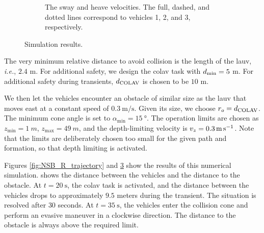 \begin{figure}[p]
\begin{subfigure}[t]{0.475\textwidth}
        \label{fig:NSB_R_surge}
        \vspace{-2.5mm}
    \end{subfigure}
    \hspace{1em}
    \begin{subfigure}[t]{0.475\textwidth}
        \centering
        \hspace*{-1.3em}
        
        \vspace{-8mm}
        \caption{The sway and heave velocities. The full, dashed, and dotted lines correspond to vehicles 1, 2, and 3, respectively.}
        \label{fig:NSB_R_sway_heave}
        \vspace{-2.5mm}
    \end{subfigure}
    \caption{Simulation results.}
    \label{fig:NSB_R_results}    
\end{figure}

The very minimum relative distance to avoid collision is the length of the \gls{lauv}, \emph{i.e.}, $2.4$ m.
For additional safety, we design the \gls{colav} task with $d_{\rm min} = 5$ m.
For additional safety during transients, $d_{\rm COLAV}$ is chosen to be $10$ m.



We then let the vehicles encounter an obstacle of similar size as the \gls{lauv} that moves east at a constant speed of $\SI{0.3}{\meter\per\second}$.
Given its size, we choose $r_o = d_{\rm COLAV}$.
The minimum cone angle is set to $\alpha_{\min} = \SI{15}{\degree}$.
The operation limits are chosen as $z_{\min} = \SI{1}{m}$, $z_{\max} = \SI{49}{m}$, and the depth-limiting velocity is $v_z = \SI{0.3}{\meter\per\second}$.
Note that the limits are deliberately chosen too small for the given path and formation, so that depth limiting is activated.



Figures \ref{fig:NSB_R_trajectory} and \ref{fig:NSB_R_results} show the results of this numerical simulation.
 shows the distance between the vehicles and the distance to the obstacle.
At $t = \SI{20}{\second}$, the \gls{colav} task is activated, and the distance between the vehicles drops to approximately $9.5$ meters during the transient.
The situation is resolved after $30$ seconds.
At $t = \SI{35}{\second}$, the vehicles enter the collision cone and perform an evasive maneuver in a clockwise direction.
The distance to the obstacle is always above the required limit.



